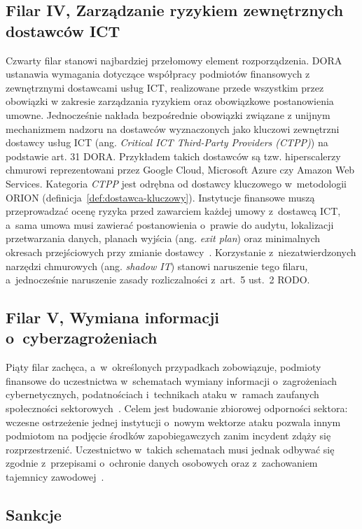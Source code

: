 \subsection*{Filar IV, Zarządzanie ryzykiem zewnętrznych dostawców ICT}

Czwarty filar stanowi najbardziej przełomowy element rozporządzenia. 
DORA ustanawia wymagania dotyczące współpracy podmiotów finansowych z zewnętrznymi dostawcami usług ICT, realizowane przede wszystkim przez obowiązki w zakresie zarządzania ryzykiem oraz obowiązkowe postanowienia umowne. Jednocześnie nakłada bezpośrednie obowiązki związane z unijnym mechanizmem nadzoru na dostawców wyznaczonych jako kluczowi zewnętrzni dostawcy usług ICT (ang. \textit{Critical ICT Third-Party Providers (CTPP)}) na podstawie art. 31 DORA. 
Przykładem takich dostawców są tzw. hiperscalerzy chmurowi reprezentowani przez Google Cloud, Microsoft Azure czy Amazon Web Services.
Kategoria \textit{CTPP} jest odrębna od dostawcy kluczowego w~metodologii ORION (definicja~\ref{def:dostawca-kluczowy}). Instytucje finansowe muszą przeprowadzać ocenę ryzyka przed zawarciem każdej umowy z~dostawcą ICT, a~sama umowa musi zawierać postanowienia
o~prawie do audytu, lokalizacji przetwarzania danych, planach wyjścia (ang. \textit{exit plan}) oraz minimalnych okresach przejściowych przy zmianie dostawcy~\autocite{eiopa_dora}.
Korzystanie z~niezatwierdzonych narzędzi chmurowych (ang. \textit{shadow IT}) stanowi naruszenie tego filaru, a~jednocześnie naruszenie zasady rozliczalności z~art.~5 ust.~2 RODO.

\subsection*{Filar V, Wymiana informacji o~cyberzagrożeniach}

Piąty filar zachęca, a~w~określonych przypadkach zobowiązuje, podmioty finansowe do uczestnictwa w~schematach wymiany informacji o~zagrożeniach cybernetycznych, podatnościach i~technikach ataku w~ramach zaufanych społeczności sektorowych~\autocite{eiopa_dora}.
Celem jest budowanie zbiorowej odporności sektora: wczesne ostrzeżenie jednej instytucji o~nowym wektorze ataku pozwala innym podmiotom na podjęcie środków zapobiegawczych zanim incydent zdąży się rozprzestrzenić. Uczestnictwo w~takich schematach musi jednak odbywać się zgodnie z~przepisami o~ochronie danych osobowych oraz z~zachowaniem tajemnicy zawodowej~\autocite{resilia_dora}.

\subsection*{Sankcje}

